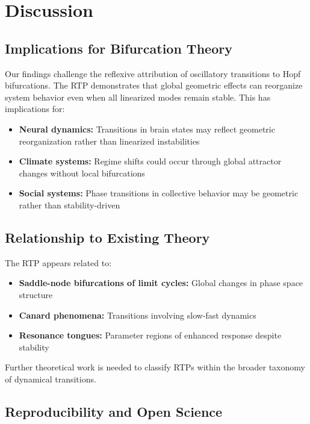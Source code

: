 \documentclass[11pt,twocolumn]{article}
\begin{document}
\section{Discussion}

\subsection{Implications for Bifurcation Theory}

Our findings challenge the reflexive attribution of oscillatory transitions to Hopf bifurcations. The RTP
demonstrates that global geometric effects can reorganize system behavior even when all linearized modes remain
stable. This has implications for:

\begin{itemize}
  \item \textbf{Neural dynamics:} Transitions in brain states may reflect geometric reorganization rather than
        linearized instabilities
  \item \textbf{Climate systems:} Regime shifts could occur through global attractor changes without local
        bifurcations
  \item \textbf{Social systems:} Phase transitions in collective behavior may be geometric rather than
        stability-driven
\end{itemize}

\subsection{Relationship to Existing Theory}

The RTP appears related to:
\begin{itemize}
  \item \textbf{Saddle-node bifurcations of limit cycles:} Global changes in phase space structure
  \item \textbf{Canard phenomena:} Transitions involving slow-fast dynamics
  \item \textbf{Resonance tongues:} Parameter regions of enhanced response despite stability
\end{itemize}

Further theoretical work is needed to classify RTPs within the broader taxonomy of dynamical transitions.

\subsection{Reproducibility and Open Science}
\end{document}
